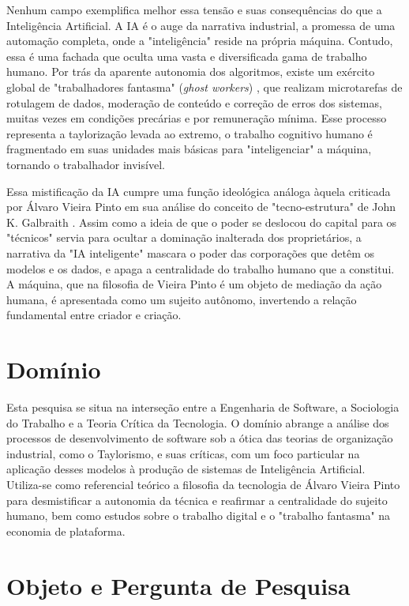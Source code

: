 Nenhum campo exemplifica melhor essa tensão e suas consequências do que a Inteligência Artificial. 
A IA é o auge da narrativa industrial, a promessa de uma automação completa, 
onde a "inteligência" reside na própria máquina. 
Contudo, essa é uma fachada que oculta uma vasta e diversificada gama de trabalho humano. 
Por trás da aparente autonomia dos 
algoritmos, existe um exército global de "trabalhadores fantasma" (\textit{ghost workers}) \cite{GraySuri2019}, que realizam microtarefas de rotulagem de dados, moderação de conteúdo e correção de erros dos 
sistemas, muitas vezes em condições precárias e por remuneração mínima. 
Esse processo representa a taylorização levada ao extremo, o trabalho cognitivo humano é fragmentado em 
suas unidades mais básicas para "inteligenciar" a máquina, tornando o trabalhador invisível. 

Essa mistificação da IA cumpre uma função ideológica análoga àquela criticada por Álvaro Vieira Pinto \cite{VieiraPinto2005} em sua análise do conceito de "tecno-estrutura" de John K. Galbraith \cite{Galbraith1967}. 
Assim como a ideia de que 
o poder se deslocou do capital para os "técnicos" servia para ocultar a dominação inalterada dos proprietários, a narrativa da "IA inteligente" mascara o poder das corporações 
que detêm os modelos e os dados, e apaga a centralidade do trabalho humano que a constitui. 
A máquina, que na filosofia de Vieira Pinto é um objeto de mediação da ação humana, 
é apresentada como um sujeito autônomo, invertendo a relação fundamental entre criador e criação. 

\section{Domínio}\label{sec:dominio}

Esta pesquisa se situa na interseção entre a Engenharia de Software, a Sociologia do Trabalho e a Teoria Crítica da Tecnologia. 
O domínio abrange a análise dos processos de 
desenvolvimento de software sob a ótica das teorias de organização industrial, como o Taylorismo, e suas críticas, com um foco particular na aplicação desses modelos à produção 
de sistemas de Inteligência Artificial. 
Utiliza-se como referencial teórico a filosofia da tecnologia de Álvaro Vieira Pinto para desmistificar a autonomia da técnica e 
reafirmar a centralidade do sujeito humano, bem como estudos sobre o trabalho digital e o "trabalho fantasma" na economia de plataforma. 

\section{Objeto e Pergunta de Pesquisa}\label{sec:obj_pergunta_pesquisa}

